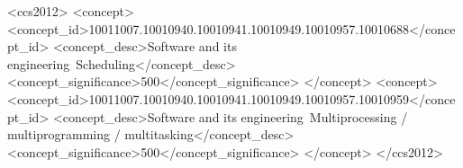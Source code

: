 \documentclass[sigconf,review,anonymous]{acmart}
\providecommand{\DIFaddbegin}{} %
\providecommand{\DIFaddend}{} %
\providecommand{\DIFdelbegin}{} %
\providecommand{\DIFdelend}{} %
\begin{document}
\begin{abstract}
\DIFdelend \end{abstract}

\begin{CCSXML}
<ccs2012>
   <concept>
       <concept_id>10011007.10010940.10010941.10010949.10010957.10010688</concept_id>
       <concept_desc>Software and its engineering~Scheduling</concept_desc>
       <concept_significance>500</concept_significance>
       </concept>
   <concept>
       <concept_id>10011007.10010940.10010941.10010949.10010957.10010959</concept_id>
       <concept_desc>Software and its engineering~Multiprocessing / multiprogramming / multitasking</concept_desc>
       <concept_significance>500</concept_significance>
       </concept>
 </ccs2012>
\end{CCSXML}


\DIFdelbegin %
\DIFdelend \DIFaddbegin {}
\DIFaddend 

\end{document}
